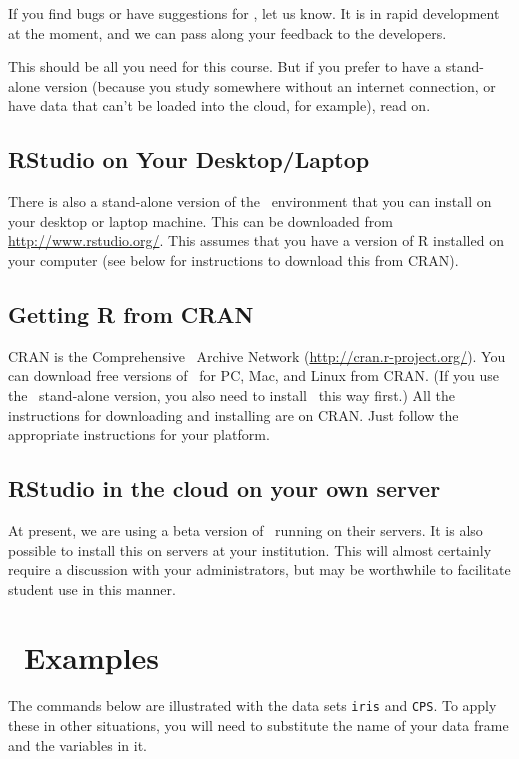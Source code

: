 If you find bugs or have suggestions for \Rstudio, let us know.  It is in rapid development
at the moment, and we can pass along your feedback to the developers.  

This should be all you need for this course.  But if you prefer to have a
stand-alone version (because you study somewhere without an internet
connection, or have data that can't be loaded into the cloud, for example), read on.


\subsection{RStudio on Your Desktop/Laptop}
There is also a stand-alone version of the \Rstudio\ environment that you can install on
your desktop or laptop machine.  
This can be downloaded from \url{http://www.rstudio.org/}.  This assumes that you 
have a version of R installed on your computer (see below for instructions to download
this from CRAN).


\subsection{Getting R from CRAN}
\label{sec:CRAN}

CRAN is the Comprehensive \R\ Archive Network (\url{http://cran.r-project.org/}).  
You can download free versions of \R\ for PC, Mac, and Linux from CRAN.  (If you use
the \Rstudio\ stand-alone version, you also need to install \R\ this way first.)
All the instructions for downloading and installing are on CRAN.  Just 
follow the appropriate instructions for your platform.

\subsection{RStudio in the cloud on your own server}

At present, we are using a beta version of \RStudio\ running on their servers.  
It is also possible to install this on servers at your institution.  This will
almost certainly require a discussion with your administrators, but may be worthwhile
to facilitate student use in this manner.



\newpage

\section{\R\ Examples}
\vspace{-3mm}
The commands below are illustrated with the data sets \verb!iris! and 
\verb!CPS!.  To apply these in other situations, you will need to 
substitute the name of your data frame and the variables in it.

